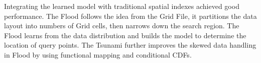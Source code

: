 Integrating the learned model with traditional spatial indexes achieved good performance. The Flood follows the idea from the Grid File, it partitions the data layout into numbers of Grid cells, then narrows down the search region. The Flood learns from the data distribution and builds the model to determine the location of query points. The Tsunami further improves the skewed data handling in Flood by using functional mapping and conditional CDFs. 
